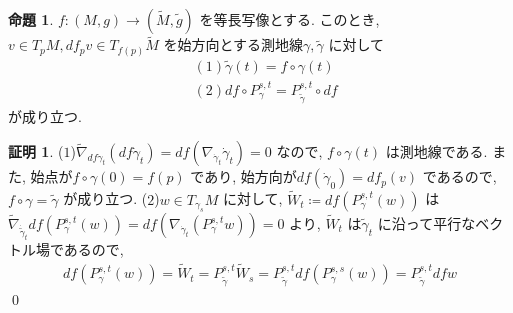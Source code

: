 \documentclass[twocolumn, landscape, a4paper , 8pt, fleqn, titlepage ]{jsarticle}
\theoremstyle{definition}
\newtheorem{prop}[dfn]{命題}
\newtheorem*{pf*}{証明}
\begin{document}
\begin{prop}
$f: (M,g) \rightarrow (\tilde M, \tilde g)$ を等長写像とする. このとき, $v \in T_pM, df_p v \in T_{f(p)} \tilde M$ を始方向とする測地線$\gamma, \tilde \gamma$ に対して
\begin{align*} &(1) \tilde \gamma (t) = f \circ \gamma (t) \\&(2)df\circ P_{\gamma}^{s,t} = P_{\tilde \gamma}^{s,t}\circ df \end{align*}
が成り立つ.
\end{prop}
\begin{pf*}
($1$)$\tilde \nabla_{df \dot \gamma_t} (df \dot \gamma_t) = df (\nabla_{\dot \gamma_t} \dot \gamma_t) = 0$ なので, $f\circ \gamma (t) $ は測地線である. また, 始点が$f \circ \gamma (0) = f(p)$ であり, 始方向が$df(\dot \gamma_0) = df_p (v)$ であるので, $f\circ \gamma = \tilde \gamma$ が成り立つ. ($2$)$w \in T_{\gamma_s} M$ に対して, $\tilde W _t \coloneqq df(P_{\gamma}^{s,t}(w))$ は$\tilde \nabla_{\dot{\tilde \gamma}_t} df(P_{\gamma}^{s,t}(w)) = df(\nabla_{\dot \gamma_t} (P_{\gamma}^{s,t} w)) = 0$ より, $\tilde W_t$ は$\tilde \gamma_t$ に沿って平行なベクトル場であるので, 
\begin{align*}df(P_{\gamma}^{s,t}(w)) =  \tilde W_t = P_{\tilde \gamma}^{s,t} \tilde W_s  = P_{\tilde \gamma}^{s,t} df(P_{\gamma}^{s,s}(w)) = P_{\tilde \gamma}^{s,t} dfw \end{align*} 
\qed
\end{pf*}
\end{document}
